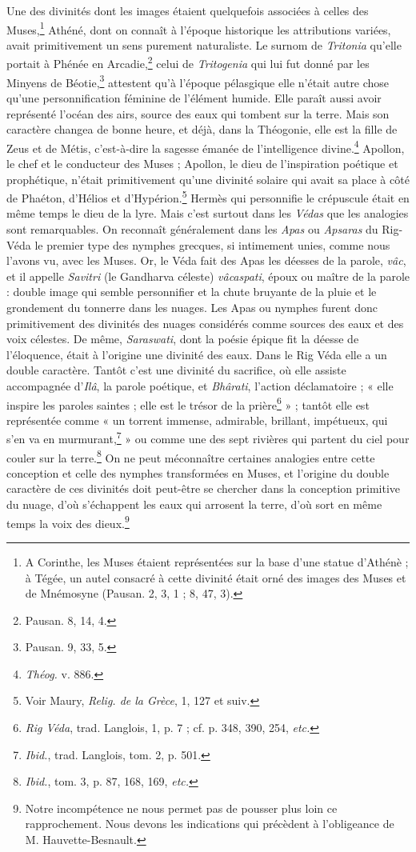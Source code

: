 \documentclass[a4paper, 11pt, oneside, polutonikogreek, french]{article}
\begin{document}
Une des divinités dont les images étaient quelquefois associées à celles des Muses,\footnote{A Corinthe, les Muses étaient représentées sur la base d'une statue d'Athénè ; à Tégée, un autel consacré à cette divinité était orné des images des Muses et de Mnémosyne (Pausan. 2, 3, 1 ; 8, 47, 3).} Athéné, dont on connaît à l'époque historique les attributions variées, avait primitivement un sens purement naturaliste. Le surnom de \emph{Tritonia} qu'elle portait à Phénée en Arcadie,\footnote{Pausan. 8, 14, 4.} celui de \emph{Tritogenia} qui lui fut donné par les Minyens de Béotie,\footnote{Pausan. 9, 33, 5.} attestent qu'à l'époque pélasgique elle n'était autre chose qu'une personnification féminine de l'élément humide. Elle paraît aussi avoir représenté l'océan des airs, source des eaux qui tombent sur la terre. Mais son caractère changea de bonne heure, et déjà, dans la Théogonie, elle est la fille de Zeus et de Métis, c'est-à-dire la sagesse émanée de l'intelligence divine.\footnote{\emph{Théog.} v. 886.} Apollon, le chef et le conducteur des Muses ; Apollon, le dieu de l'inspiration poétique et prophétique, n'était primitivement qu'une divinité solaire qui avait sa place à côté de Phaéton, d'Hélios et d'Hypérion.\footnote{Voir Maury, \emph{Relig. de la Grèce}, 1, 127 et suiv.} Hermès qui personnifie le crépuscule était en même temps le dieu de la lyre. Mais c'est surtout dans les \emph{Védas} que les analogies sont remarquables. On reconnaît généralement dans les \emph{Apas} ou \emph{Apsaras} du Rig-Véda le premier type des nymphes grecques, si intimement unies, comme nous l'avons vu, avec les Muses. Or, le Véda fait des Apas les déesses de la parole, \emph{vâc}, et il appelle \emph{Savitri} (le Gandharva céleste) \emph{vâcaspati}, époux ou maître de la parole : double image qui semble personnifier et la chute bruyante de la pluie et le grondement du tonnerre dans les nuages. Les Apas ou nymphes furent donc primitivement des divinités des nuages considérés comme sources des eaux et des voix célestes. De même, \emph{Saraswati}, dont la poésie épique fit la déesse de l'éloquence, était à l'origine une divinité des eaux. Dans le Rig Véda elle a un double caractère. Tantôt c'est une divinité du sacrifice, où elle assiste accompagnée d'\emph{Ilâ}, la parole poétique, et \emph{Bhârati}, l'action déclamatoire ; « elle inspire les paroles saintes ; elle est le trésor de la prière\footnote{\emph{Rig Véda}, trad. Langlois, 1, p. 7 ; cf. p. 348, 390, 254, \emph{etc.}} » ; tantôt elle est représentée comme « un torrent immense, admirable, brillant, impétueux, qui s'en va en murmurant,\footnote{\emph{Ibid.}, trad. Langlois, tom. 2, p. 501.} » ou comme une des sept rivières qui partent du ciel pour couler sur la terre.\footnote{\emph{Ibid.}, tom. 3, p. 87, 168, 169, \emph{etc.}} On ne peut méconnaître certaines analogies entre cette conception et celle des nymphes transformées en Muses, et l'origine du double caractère de ces divinités doit peut-être se chercher dans la conception primitive du nuage, d'où s'échappent les eaux qui arrosent la terre, d'où sort en même temps la voix des dieux.\footnote{Notre incompétence ne nous permet pas de pousser plus loin ce rapprochement. Nous devons les indications qui précèdent à l'obligeance de M. Hauvette-Besnault.}
\clearpage
\end{document}
